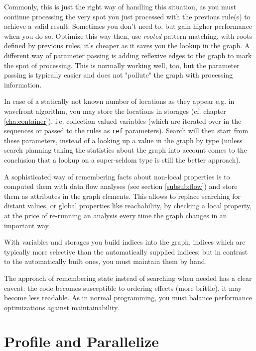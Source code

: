 Commonly, this is just the right way of handling this situation, 
as you must continue processing the very spot you just processed with the previous rule(s) to achieve a valid result.
Sometimes you don't need to, but gain higher performance when you do so.
Optimize this way then, use \emph{rooted} pattern matching, with roots defined by previous rules, it's cheaper as it saves you the lookup in the graph.
A different way of parameter passing is adding reflexive edges to the graph to mark the spot of processing.
This is normally working well, too, but the parameter passing is typically easier and does not "pollute" the graph with processing information.

In case of a statically not known number of locations as they appear e.g. in wavefront algorithm, you may store the locations in storages (cf. chapter \ref{cha:container}), i.e. collection valued variables (which are iterated over in the sequences or passed to the rules as \texttt{ref} parameters).
Search will then start from these parameters, instead of a looking up a value in the graph by type (unless search planning taking the statistics about the graph into account comes to the conclusion that a lookup on a super-seldom type is still the better approach).

A sophisticated way of remembering facts about non-local properties is to computed them with data flow analyses (see section \ref{subsub:flow}) and store them as attributes in the graph elements.
This allows to replace searching for distant values, or global properties like reachability, by checking a local property, at the price of re-running an analysis every time the graph changes in an important way.

With variables and storages you build indices into the graph, indices which are typically more selective than the automatically supplied indices; 
but in contrast to the automatically built ones, you must maintain them by hand.

The approach of remembering state instead of searching when needed has a clear caveat: the code becomes susceptible to ordering effects (more brittle), it may become less readable. As in normal programming, you must balance performance optimizations against maintainability.


\section{Profile and Parallelize}\label{sec:performanceparallel}

